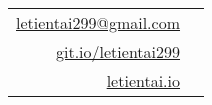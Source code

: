 { %
  \def\arraystretch{1.3}

  \begin{tabular}{
      @{} >{\centering\arraybackslash} r @{\hskip5pt}
       >{\centering\arraybackslash} l @{}
    }
    \href{mailto:letientai299@gmail.com}{letientai299@gmail.com}\\
    \href{https://github.com/letientai299}{git.io/letientai299}\\
    \href{https://letientai.io}{letientai.io}\\
  \end{tabular}
}
